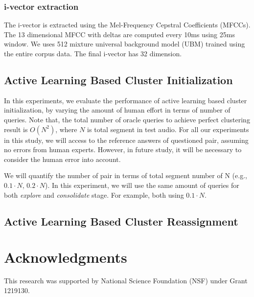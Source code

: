 \documentclass[journal]{IEEEtran}
\begin{document}
\subsubsection{i-vector extraction}
The i-vector is extracted using the Mel-Frequency Cepstral Coefficients (MFCCs). The 13 dimensional MFCC with deltas are computed every 10ms using 25ms window. We uses 512 mixture universal background model (UBM) trained using the entire corpus data. The final i-vector has 32 dimension. 

\subsection{Active Learning Based Cluster Initialization}
In this experiments, we evaluate the performance of active learning based cluster initialization, by varying the amount of human effort in terms of number of queries. Note that, the total number of oracle queries to achieve perfect clustering result is $O(N^2)$, where $N$ is total segment in test audio.
For all our experiments in this study, we will access to the reference answers of questioned pair, assuming no errors from human experts. However, in future study, it will be necessary to consider the human error into account.

We will quantify the number of pair in terms of total segment number of N (e.g., $0.1 \cdot N$, $0.2 \cdot N$). In this experiment, we will use the same amount of queries for both \textit{explore} and \textit{consolidate} stage. For example, both using $0.1 \cdot N$.


\subsection{Active Learning Based Cluster Reassignment}

\section*{Acknowledgments}
This research was supported by National Science Foundation (NSF) under Grant 1219130.
 



\end{document}
